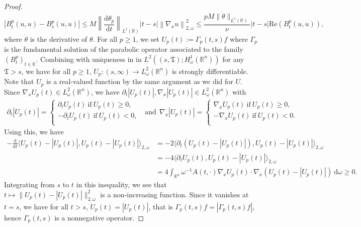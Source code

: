 \documentclass[12pt, letterpaper]{amsart}
\theoremstyle{definition}
\theoremstyle{remark}
\numberwithin{equation}{section}
\begin{document}
\begin{proof}
$$\left| B_t^p(u,u)-B_s^p(u,u) \right| \leq M  \left\| \frac{\mathrm{d} \theta_p}{\mathrm{d} t}\right\|_{L^1(\mathbb{R})} \left| t-s \right| \left\|\nabla_x u  \right\|_{2,\omega}^2\leq \frac{pM \| \dot{\theta} \|_{L^1(\mathbb{R})}}{\nu} \left| t-s \right|\mathrm{Re}(B_t^p(u,u)),$$ 
where $\dot{\theta}$ is the derivative of $\theta$. For all $p\geq 1$, we set $U_p(t):=\Gamma_p(t,s)f$ where $\Gamma_p$ is the fundamental solution of the parabolic operator associated to the family $(B^p_t)_{{t \in \mathbb{R}}}$. Combining \cite[Theorem III]{kato1961abstract} with uniqueness in in $L^2((s,\mathfrak{T});H^1_\omega(\mathbb{R}^n))$ for any $\mathfrak{T}>s$, we have for all $p \geq 1$, $U_p : (s,\infty) \rightarrow L^2_\omega(\mathbb{R}^n)$ is strongly differentiable. Note that $U_p$ is a real-valued function by the same argument as we did for $U$. Since $\nabla_x U_p(t) \in L^2_\omega(\mathbb{R}^n)$, we have $\partial_t \left |U_p(t)  \right |, \nabla_x \left |  U_p(t)\right | \in L^2_\omega(\mathbb{R}^n)$ with
 \begin{align*}
 \partial_t \left |U_p(t)  \right |  =\left\{\begin{matrix}
 \partial_t U_p(t) \ \mathrm{if} \ U_p(t)\geq 0, \\ 
 -\partial_t U_p(t) \ \mathrm{if} \ U_p(t)< 0 ,
 \\ 
 \end{matrix}\right. 
\ \ \ \text{and} \ \ 
\nabla_x \left |  U_p(t)\right |    =\left\{\begin{matrix}
\nabla_x U_p(t)  \ \mathrm{if} \ U_p(t)\geq 0, \\ 
 -\nabla_x U_p(t) \ \mathrm{if} \ U_p(t)< 0 .
 \\ 
 \end{matrix}\right.  
 \end{align*}
Using this, we have
\begin{align*}
      - \frac{\mathrm{d}}{\mathrm{d}t}  \langle U_p(t)-\left | U_p(t) \right | , U_p(t)-\left | U_p(t) \right |\rangle_{2,\omega}
      &= -2 \langle \partial_t \left ( U_p(t)-\left | U_p(t) \right | \right ) , U_p(t)-\left | U_p(t) \right |\rangle_{2,\omega}
      \\&= -  4\langle \partial_t U_p(t) , U_p(t)-\left | U_p(t) \right |\rangle_{2,\omega}
      \\&= 4\int_{\mathbb{R}^n} \omega^{-1} A(t,\cdot)\nabla_x U_p(t) \cdot \nabla_x (U_p(t)-\left | U_p(t) \right |) \ \mathrm{d}\omega \geq 0.
\end{align*}
Integrating from $s$ to $t$ in this inequality, we see that $t \mapsto \| U_p(t)-|U_p(t)|\|^2_{2,\omega}$ is a non-increasing function. Since it vanishes at $t=s$, we have for all $t>s$, $ U_p(t)=\left | U_p(t) \right |$, that is $\Gamma_p(t,s)f= \left | \Gamma_p(t,s)f \right |$, hence $\Gamma_p(t,s)$ is a nonnegative operator.\newline

\end{proof}
\end{document}
